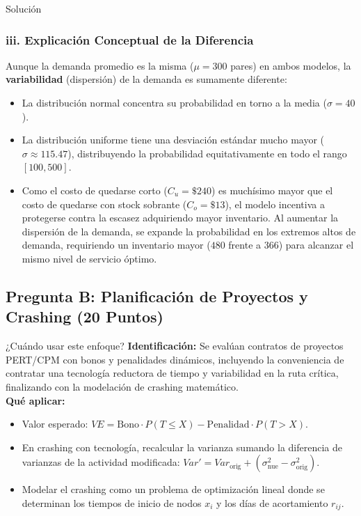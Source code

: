 \documentclass[11pt, a4paper]{article}
\begin{document}
\begin{ejercicio}{Solución}
  \subsubsection*{iii. Explicación Conceptual de la Diferencia}
  Aunque la demanda promedio es la misma ($\mu = 300$ pares) en ambos modelos, la \textbf{variabilidad} (dispersión) de la demanda es sumamente diferente:
  \begin{itemize}
    \item La distribución normal concentra su probabilidad en torno a la media ($\sigma = 40$).
    \item La distribución uniforme tiene una desviación estándar mucho mayor ($\sigma \approx 115.47$), distribuyendo la probabilidad equitativamente en todo el rango $[100, 500]$.
    \item Como el costo de quedarse corto ($C_u = \$240$) es muchísimo mayor que el costo de quedarse con stock sobrante ($C_o = \$13$), el modelo incentiva a protegerse contra la escasez adquiriendo mayor inventario. Al aumentar la dispersión de la demanda, se expande la probabilidad en los extremos altos de demanda, requiriendo un inventario mayor ($480$ frente a $366$) para alcanzar el mismo nivel de servicio óptimo.
  \end{itemize}

\end{ejercicio}

\newpage

\subsection*{Pregunta B: Planificación de Proyectos y Crashing (20 Puntos)}

  \begin{tipprueba}{¿Cuándo usar este enfoque?}
    \textbf{Identificación:} Se evalúan contratos de proyectos PERT/CPM con bonos y penalidades dinámicos, incluyendo la conveniencia de contratar una tecnología reductora de tiempo y variabilidad en la ruta crítica, finalizando con la modelación de crashing matemático.\\
    \textbf{Qué aplicar:}
    \begin{itemize}
      \item Valor esperado: $VE = \text{Bono} \cdot P(T \le X) - \text{Penalidad} \cdot P(T > X)$.
      \item En crashing con tecnología, recalcular la varianza sumando la diferencia de varianzas de la actividad modificada: $Var' = Var_{\text{orig}} + (\sigma_{\text{nue}}^2 - \sigma_{\text{orig}}^2)$.
      \item Modelar el crashing como un problema de optimización lineal donde se determinan los tiempos de inicio de nodos $x_i$ y los días de acortamiento $r_{ij}$.
    \end{itemize}
  \end{tipprueba}
\end{document}
